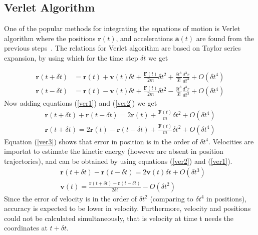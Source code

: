 \subsection{Verlet Algorithm}
\begin{sloppypar}
One of the popular methods for integrating the equations of motion is Verlet algorithm where the positions $\textbf{r}(t)$, and
accelerations $\textbf{a}(t)$ are found from the previous steps~\citep{Frenkel2002}. The relations for Verlet algorithm are based on Taylor series expansion, by using which for the time step $\delta t$ we get 
\end{sloppypar}
\vspace{-20pt}
\begin{align}
\textbf{r}(t+\delta t) & = \textbf{r}(t) + \textbf{v}(t) \delta t + \frac{\textbf{F}(t)}{2 m} \delta t^2 + \frac{\delta t^3}{3!} \frac{d^3 r}{d t^3} + O(\delta t^4) \label{ver1} \\
\textbf{r}(t-\delta t) & = \textbf{r}(t) - \textbf{v}(t) \delta t + \frac{\textbf{F}(t)}{2 m} \delta t^2 - \frac{\delta t^3}{3!} \frac{d^3 r}{d t^3} + O(\delta t^4) \label{ver2}
\end{align}
Now adding equations (\ref{ver1}) and (\ref{ver2}) we get 
\begin{align}
\textbf{r}(t+\delta t) + \textbf{r}(t-\delta t) = 2 \textbf{r}(t) + \frac{\textbf{F}(t)}{m} \delta t^2 + O(\delta t^4) \\
\textbf{r}(t+\delta t) = 2 \textbf{r}(t)-\textbf{r}(t-\delta t) + \frac{\textbf{F}(t)}{m} \delta t^2 + O(\delta t^4)
\label{ver3}
\end{align}
Equation (\ref{ver3}) shows that error in position is in the order of $\delta t^4$. Velocities are importat to estimate the kinetic energy (however are absent in position trajectories), and can be obtained by using equations
(\ref{ver2}) and (\ref{ver1}). 
\begin{align}
& \textbf{r}(t+\delta t) - \textbf{r}(t-\delta t) = 2 \textbf{v}(t) \delta t + O(\delta t^3) \\
\label{verlv}
& \textbf{v}(t) = \frac{\textbf{r}(t+\delta t) -\textbf{r}(t-\delta t)}{2 \delta t} - O(\delta t^2) 
\end{align}
Since the error of velocity is in the order of $\delta t^2$ (comparing to $\delta t^4$ in positions), accuracy 
is expected to be lower in velocity. Furthermore, velocity and positions could not be calculated simultaneously, 
that is velocity at time t needs the coordinates at $t+\delta t$. 

